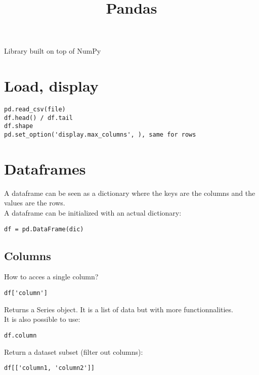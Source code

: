 \documentclass[french]{article}
\title{Pandas}
\begin{document}
\date{}

\maketitle

\setlength{\parindent}{0cm}

Library built on top of NumPy

\section{Load, display}

\begin{verbatim}
pd.read_csv(file)
df.head() / df.tail
df.shape
pd.set_option('display.max_columns', ), same for rows
\end{verbatim}

\section{Dataframes}

A dataframe can be seen as a dictionary where the keys are the columns and the values are the rows.\\
A dataframe can be initialized with an actual dictionary:
\begin{verbatim}
df = pd.DataFrame(dic)
\end{verbatim}

\subsection{Columns}

How to acces a single column?
\begin{verbatim}
df['column']
\end{verbatim}
Returns a Series object. It is a list of data but with more functionnalities.\\
It is also possible to use:
\begin{verbatim}
df.column
\end{verbatim}
Return a dataset subset (filter out columns):
\begin{verbatim}
df[['column1, 'column2']]
\end{verbatim}
\end{document}
